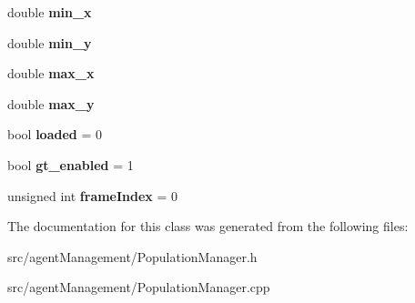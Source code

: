 \begin{DoxyCompactItemize}
\item 
double {\bfseries min\+\_\+x}\hypertarget{classPopulationManager_a7d1b15dc7382fb2c983016a97e5929c2}{}\label{classPopulationManager_a7d1b15dc7382fb2c983016a97e5929c2}

\item 
double {\bfseries min\+\_\+y}\hypertarget{classPopulationManager_a00fa3879b5ab8777413c53c637f90eb0}{}\label{classPopulationManager_a00fa3879b5ab8777413c53c637f90eb0}

\item 
double {\bfseries max\+\_\+x}\hypertarget{classPopulationManager_a4ab5137b2cc1a7b2524bf0762c8e3d0e}{}\label{classPopulationManager_a4ab5137b2cc1a7b2524bf0762c8e3d0e}

\item 
double {\bfseries max\+\_\+y}\hypertarget{classPopulationManager_ab7326fb1c1004354ad4918db911052eb}{}\label{classPopulationManager_ab7326fb1c1004354ad4918db911052eb}

\item 
bool {\bfseries loaded} = 0\hypertarget{classPopulationManager_acf20d29d3095007ef674415702b836f5}{}\label{classPopulationManager_acf20d29d3095007ef674415702b836f5}

\item 
bool {\bfseries gt\+\_\+enabled} = 1\hypertarget{classPopulationManager_a5c34a8449db919ec03bb784d3dd9dc52}{}\label{classPopulationManager_a5c34a8449db919ec03bb784d3dd9dc52}

\item 
unsigned int {\bfseries frame\+Index} = 0\hypertarget{classPopulationManager_ac25b65c23880b06dcafc91de1e3a78a4}{}\label{classPopulationManager_ac25b65c23880b06dcafc91de1e3a78a4}

\end{DoxyCompactItemize}


The documentation for this class was generated from the following files\+:\begin{DoxyCompactItemize}
\item 
src/agent\+Management/Population\+Manager.\+h\item 
src/agent\+Management/Population\+Manager.\+cpp\end{DoxyCompactItemize}
